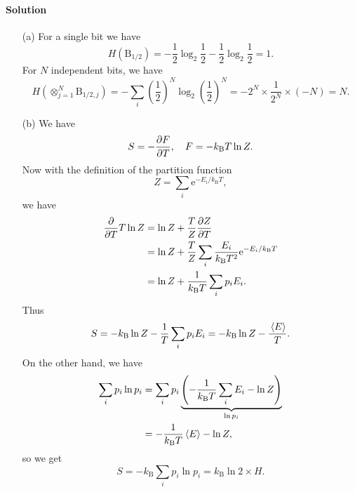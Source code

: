 \documentclass[hyperref, a4paper]{article}
\newcommand*{\ee}{\mathrm{e}}
\begin{document}
\paragraph{Solution} \begin{itemize}
\item[(a)] For a single bit we have 
\begin{equation}
    H(\mathrm{B}_{1/2}) = - \frac{1}{2} \log_2 \frac{1}{2} - \frac{1}{2} \log_2 \frac{1}{2} = 1.
\end{equation}
For $N$ independent bits,
we have 
\begin{equation}
    H(\otimes_{j=1}^N \mathrm{B}_{1/2, j}) = - \sum_{i} \left(\frac{1}{2}\right)^N \log_2 \left(\frac{1}{2}\right)^N = - 2^N \times \frac{1}{2^N} \times (- N) = N.
\end{equation}

\item[(b)] We have 
\[
    S = - \pdv{F}{T}, \quad F = - k _{\text{B}} T \ln Z.
\]
Now with the definition of the partition function 
\begin{equation}
    Z = \sum_i \ee^{- E_i / k_{\text{B}} T},
\end{equation}
we have 
\[
    \begin{aligned}
        \pdv{T} T \ln Z &= \ln Z + \frac{T}{Z} \pdv{Z}{T} \\
        &= \ln Z + \frac{T}{Z} \sum_i \frac{E_i}{k_{\text{B}} T^2} \ee^{- E_i / k_{\text{B}} T} \\
        &= \ln Z + \frac{1}{k_{\text{B}} T} \sum_i p_i E_i.
    \end{aligned}
\]
Thus 
\begin{equation}
    S = - k_{\text{B}} \ln Z - \frac{1}{T} \sum_i p_i E_i = - k_{\text{B}} \ln Z - \frac{\expval*{E}}{T}.
\end{equation}
On the other hand, we have 
\[
    \begin{aligned}
        \sum_i p_i \ln p_i &= 
        \sum_i p_i
        \underbrace{\left( - \frac{1}{k_{\text{B}} T} \sum_i E_i - \ln Z \right)}_{\ln p_i} \\
        &= - \frac{1}{k_{\text{B}} T} \expval{E} - \ln Z,
    \end{aligned}
\]
so we get 
\begin{equation}
    S = - k_{\text{B}} \sum_i p_i \ln p_i = k_{\text{B}} \ln 2 \times H.
    \label{eq:shannon-canonical}
\end{equation}


\end{itemize}
\end{document}
